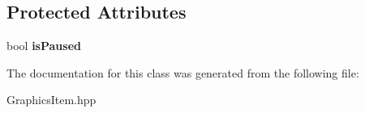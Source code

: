 \subsection*{Protected Attributes}
\begin{DoxyCompactItemize}
\item 
\hypertarget{classGraphicsItem_a1a81e11e28f3ea510cd96c1eede3d905}{}\label{classGraphicsItem_a1a81e11e28f3ea510cd96c1eede3d905} 
bool {\bfseries is\+Paused}
\end{DoxyCompactItemize}


The documentation for this class was generated from the following file\+:\begin{DoxyCompactItemize}
\item 
Graphics\+Item.\+hpp\end{DoxyCompactItemize}
